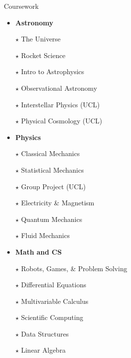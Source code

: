 \documentclass{resume} %
\newcommand{\tab}[1]{\hspace{.2667\textwidth}\rlap{#1}}
\newcommand{\itab}[1]{\hspace{0em}\rlap{#1}}
\begin{document}
\begin{rSection}{Coursework}
\begin{multicols}{3}
    \begin{itemize}[label={}]\setlength\itemsep{-6pt}
        \item \textbf{Astronomy}
        \item[$\star$] The Universe
        \item[$\star$] Rocket Science
        \item[$\star$] Intro to Astrophysics
        \item[$\star$] Observational Astronomy
        \item[$\star$] Interstellar Physics (UCL)
        \item[$\star$] Physical Cosmology (UCL)

        \item \textbf{Physics}
        \item[$\star$] Classical Mechanics
        \item[$\star$]  Statistical Mechanics
        \item[$\star$] Group Project (UCL)
        \item[$\star$]  Electricity \& Magnetism
        \item[$\star$] Quantum Mechanics
        \item[$\star$] Fluid Mechanics

        \item \textbf{Math and CS}
        \item[$\star$] Robots, Games, \& Problem Solving
        \item[$\star$] Differential Equations
        \item[$\star$] Multivariable Calculus
        \item[$\star$] Scientific Computing
        \item[$\star$] Data Structures
        \item[$\star$] Linear Algebra

    \end{itemize}
    \end{multicols}



\end{rSection} %
\end{document}
